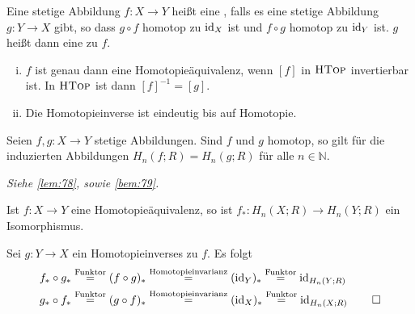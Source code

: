 \begin{definition}[{name=[Homotopieäquivalenz und Homotopieinverse]}]
	Eine stetige Abbildung $f \colon X \to Y$ heißt eine , falls es eine stetige Abbildung $g \colon Y \to X$ gibt, so dass $g \circ f$ homotop zu $\operatorname{id}_X$ ist und $f \circ g$ homotop zu $\operatorname{id}_Y$ ist. 
	$g$ heißt dann eine  zu $f$.
\end{definition}
\begin{enumerate}[(i)]
	\item $f$ ist genau dann eine Homotopieäquivalenz, wenn $[f]$ in $\textsc{HTop}$ invertierbar ist. In $\textsc{HTop}$ ist dann $[f]^{-1} = [g]$.
	\item Die Homotopieinverse ist eindeutig bis auf Homotopie.
\end{enumerate}

\begin{satz}[{name=[Homotopieinvarianz der Homologie]},label=satz:73]
	Seien $f,g \colon X \to Y$ stetige Abbildungen. 
	Sind $f$ und $g$ homotop, so gilt für die induzierten Abbildungen $H_n(f;R) = H_n(g;R)$ für alle $n \in \mathbb{N}$.
\end{satz}
\begin{beweis}
	\emph{Siehe \autoref{lem:78}, sowie \autoref{bem:79}.}
\end{beweis}

\begin{korollar}[{name=[Die induzierte Abbildung einer Homotopieäquivalenz ist ein Isomorphismus]},label=kor:74]
	Ist $f \colon X \to Y$ eine Homotopieäquivalenz, so ist $f_* \colon H_n(X;R) \to H_n(Y;R)$ ein Isomorphismus.
\end{korollar}
\begin{beweis}
	Sei $g \colon Y \to X$ ein Homotopieinverses zu $f$. Es folgt 
	\begin{align*}
		f_* \circ g_* &\stackrel{\text{Funktor}}{=} (f \circ g)_* \stackrel{\text{Homotopieinvarianz}}{=} (\operatorname{id}_Y)_* \stackrel{\text{Funktor}}{=} \operatorname{id}_{H_n(Y;R)} \\
		g_* \circ f_* &\stackrel{\text{Funktor}}{=} (g \circ f)_* \stackrel{\text{Homotopieinvarianz}}{=} (\operatorname{id}_X)_* \stackrel{\text{Funktor}}{=} \operatorname{id}_{H_n(X;R)}\qedhere
	\end{align*}
\end{beweis}

